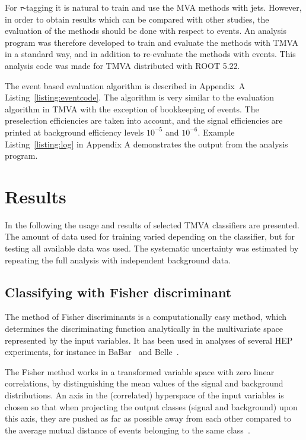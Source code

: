 \documentclass[a4paper]{jpconf}
\begin{document}


For $\tau$-tagging it is natural to train and use the MVA methods with jets. 
However, in order to obtain results which can be compared with other studies, 
the evaluation of the methods should be done with respect to events. 
An analysis program was therefore developed to train and evaluate the methods with TMVA in a standard way, 
and in addition to re-evaluate the methods with events.
This analysis code was made for TMVA distributed with ROOT 5.22.

The event based evaluation algorithm is described in Appendix~A Listing~\ref{listing:eventcode}.
The algorithm is very similar to the evaluation algorithm in TMVA 
with the exception of bookkeeping of events. 
The preselection efficiencies are taken into account, 
and the signal efficiencies are printed at background efficiency levels $10^{-5}$ and $10^{-6}$. 
Example Listing~\ref{listing:log} in Appendix A demonstrates the output from the analysis program.


\section{Results}\label{sec:results}
In the following the usage and results of selected TMVA classifiers are presented.
The amount of data used for training varied depending on the classifier, 
but for testing all available data was used.
The systematic uncertainty was estimated by repeating the full analysis with independent background data.

\subsection{Classifying with Fisher discriminant}
The method of Fisher discriminants is a computationally easy method,
which determines the discriminating function analytically in the
multivariate space represented by the input variables.  
It has been used in analyses of several HEP experiments, 
for instance in BaBar~\cite{fisherbabar} and Belle~\cite{fisherbelle}.

The Fisher method works in a transformed variable space with zero
linear correlations, by distinguishing the mean values of the signal
and background distributions. An axis in the (correlated) hyperspace
of the input variables is chosen so that when projecting the output
classes (signal and background) upon this axis, they are pushed as far
as possible away from each other compared to the average mutual
distance of events belonging to the same class~\cite{tmvasite}.
\end{document}
